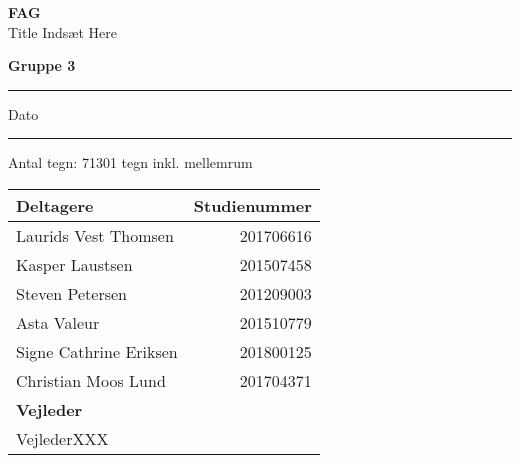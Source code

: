 \begin{titlepage}
       \Huge
       \textbf{FAG}\\
       Title Indsæt Here
       
        \Large
       \vspace{0.5cm}
        \textbf{Gruppe 3}
        \plainbreak{0.5}
        Dato
        \plainbreak{0.5}
        Antal tegn: 71301 tegn inkl. mellemrum
        \vspace{4.1cm}
      

\begin{center}


 
 
       \vspace{0.5cm}
        \normalsize
        \begin{tabular}{lr}
           \begin{minipage}[t]{7CM} \textbf{Deltagere} \vspace{1mm}\end{minipage}  &  \textbf{Studienummer}\\
            \toprule
            Laurids Vest Thomsen    &  201706616\\
            Kasper Laustsen         &  201507458\\
            Steven Petersen         &  201209003\\
            Asta Valeur             &  201510779\\
            Signe Cathrine Eriksen  &  201800125\\
            Christian Moos Lund     &  201704371\\
            \bottomrule
            \begin{minipage}[t]{7CM} \vspace{2mm} \textbf{Vejleder} \vspace{1mm}\end{minipage}  &  \textbf{}\\
            \toprule
            VejlederXXX           & \\
            \bottomrule
        \end{tabular}
 \end{center}
       \vfill

    
       \vspace{0.8cm}
\thispagestyle{empty}
\end{titlepage}
\newpage
